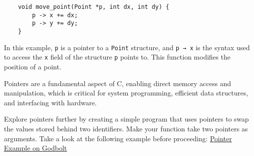 \documentclass{dcbl/challenge}
\begin{document}
\begin{aufgabe}
\begin{lstlisting}
    void move_point(Point *p, int dx, int dy) {
        p -> x += dx;
        p -> y += dy;
    }
\end{lstlisting}
In this example, \texttt{p} is a pointer to a \texttt{Point} structure, and \texttt{p → x} is the syntax used to access the \texttt{x} field of the structure \texttt{p} points to. This function modifies the position of a point.

Pointers are a fundamental aspect of C, enabling direct memory access and manipulation, which is critical for system programming, efficient data structures, and interfacing with hardware.

Explore pointers further by creating a simple program that uses pointers to swap the values stored behind two identifiers.
Make your function take two pointers as arguments.
Take a look at the following example before proceeding: \href{https://godbolt.org/#z:OYLghAFBqd5QCxAYwPYBMCmBRdBLAF1QCcAaPECAMzwBtMA7AQwFtMQByARg9KtQYEAysib0QXACx8BBAKoBnTAAUAHpwAMvAFYTStJg1DIApACYAQuYukl9ZATwDKjdAGFUtAK4sGIAMxmpK4AMngMmAByPgBGmMQgZkEADqgKhE4MHt6%2BASlpGQJhEdEscQlJtpj2jgJCBEzEBNk%2BfoFVNZn1jQTFUbHxiUEKDU0tue0jPX2l5UMAlLaoXsTI7Bzm/uHI3lgm/m4j%2BKgAdAj72CYaAIKb27uY%2B4cE6DGonmcXV7c33%2BEEAGoWExwhB5iYAOxWG4A2EA/5wgEAN0aXAB%2BwAIgCuPtoddEQoECRAcjGmZ0f4sVwzLjvoiEXCUcR/BSqWZ/LSYXDaAJgIzGpJWdj2ZJOfjubyATyjKTiABWIXU/ySOVixEAfQs71osoAbIrcQCAPRGgEAdSYCDIAPQTD1AIYeGQCEBGnhIzpcKoPKYgKZEMV7JOKt1arh6GWMXosoAHIHlSc5bqITGxZ7YcliP8qBBzGYzfE/QJ0XK3Bp/By5RZJBpcVwWLK0YjYSB0WY5egS2WKyYqxoWL23Aw86RG%2BD/HjEZns7mktd0MRMAolMji4Py5Xq7WJ/XG82Aa3zHLkl2N72LP3B8PKm3dUyuOPJ3Dp4Ic3mC01VwxTz2q5JRTuDZMuS%2B6Hu2nbrr%2BF4DqW15BLKZiPumAIvgQb5zguS4rkia6lmef4ARYu7AaBbbHj%2Bm6XrBI63sBSFchmWavrO%2BaFl%2BFHniqdZAY0LKkUeEF4VBVFDjRTL%2BPR4qMTOebzouy6YOxkGblxgGynxiJgeRynniJcGjuYd68ZJU5MWhLEfkW346X%2BOJqUygr8e2tCCd2lEwaJN4OSZz5mehZhyVhik4dZQkqXZRE8cQjmaWRJ42dBV40YZ3lhtJzHvmxIUcX%2B26RbKCpOXKtAuTliXUV5jRyj56XmbJmEKUpYWcXlxFVUV8XNX2Hn6bRVU1ShfkWVluFuZxhFtcQ%2BpFa5%2BHlZ58FMrqA2of5gWNdlCX/tx9rNlpnVjd1SU3iljTLWlg0yUkllNYd1aqvZjQBkVVBlXpYlPStQ31fJ2GjXNqn5f6HVvT1yVmEZxAQl9V2sZ%2Bm1ddWEWTXGRW0K9CXvZVxAxjDGUYb9wX/VBkjI1FqOxUeB1zVj8GnTjknIYuBArN%2BeXfJCGLfBwiy0Jwcq8H4HBaKQqCcG41jWACCjLKsimbDwpAEJoPOLAA1iAcoAJwnGYKa6lwWta7qMa6v4SYqvonCSILKui5wvAKCAGhKyrixwLASCYKomDIF4RBkBQECNMACjKIY1RCESADuQuK2gLDJHQvqZOHES0FHqCx3bCdJ/QCTAFwGhBLndDxJErDrLwpf5wA8v7mfZ8LvDe771zEKHDvBD7yD1PgQu8PwggiGI7BSDIgiKCo6jN6QuhcPohjGJLlj6HgMRO5AiyoMktQME7HC8KgSLxFmWCb2CpDEF4gh4GwAAq2oX4sMsrGsehHOEaeRzHce8NHxAmDJE4DwXm/NbazzFhwbAPd/YkABKoU2ABaXUgpgDIGQNiDQusAQQAlpYawo5cCEHgQreYvBlbN3mOrEANYTgQjMFwfwMYNDliYag82corYcBtqQIWIsoGO2dq7KhYCOBmAgQIrulCtDUNICfYg6RnCSCAA%3D%3D%3D}{Pointer Example on Godbolt}

\end{aufgabe}
\end{document}
